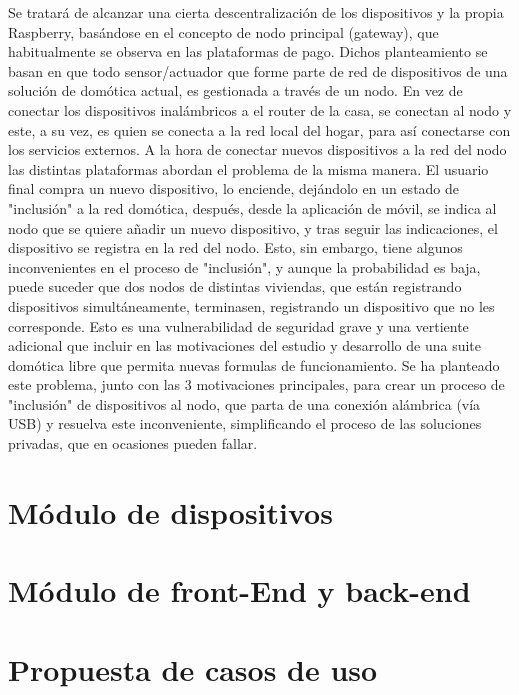 Se tratará de alcanzar una cierta descentralización de los dispositivos y la propia Raspberry, basándose en el concepto de nodo principal (gateway), que habitualmente se observa en las plataformas de pago. Dichos planteamiento se basan en que todo sensor/actuador que forme parte de red de dispositivos de una solución de domótica actual, es gestionada a través de un nodo. En vez de conectar los dispositivos inalámbricos a el router de la casa, se conectan al nodo y este, a su vez, es quien se conecta a la red local del hogar, para así conectarse con los servicios externos. A la hora de conectar nuevos dispositivos a la red del nodo las distintas plataformas abordan el problema de la misma manera. El usuario final compra un nuevo dispositivo, lo enciende, dejándolo en un estado de "inclusión" a la red domótica, después, desde la aplicación de móvil, se indica al nodo que se quiere añadir un nuevo dispositivo, y tras seguir las indicaciones, el dispositivo se registra en la red del nodo. Esto, sin embargo, tiene algunos inconvenientes en el proceso de "inclusión", y aunque la probabilidad es baja, puede suceder que dos nodos de distintas viviendas, que están registrando dispositivos simultáneamente, terminasen, registrando un dispositivo que no les corresponde. Esto es una vulnerabilidad de seguridad grave y una vertiente adicional que incluir en las motivaciones del estudio y desarrollo de una suite domótica libre que permita nuevas formulas de funcionamiento. Se ha planteado este problema, junto con las 3 motivaciones principales, para crear un proceso de "inclusión" de dispositivos al nodo, que parta de una conexión alámbrica (vía USB) y resuelva este inconveniente, simplificando el proceso de las soluciones privadas, que en ocasiones pueden fallar.

\vspace{1cm}


\section{Módulo de dispositivos}
\label{ch:Capitulo3.3}



\section{Módulo de front-End y back-end}
\label{ch:Capitulo3.4}

\section{Propuesta de casos de uso}
\label{ch:Capitulo3.5}

